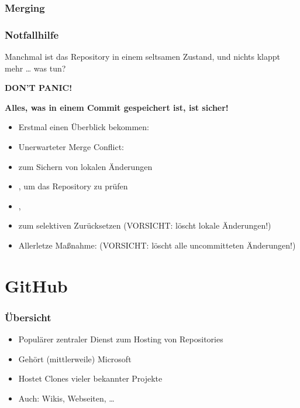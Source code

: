 \documentclass{cms-kurs}
\begin{document}
\begin{frame}
  \frametitle{Merging}

  \onslide<+->


\end{frame}

\begin{frame}
  \frametitle{Notfallhilfe}

  \onslide<+->

  Manchmal ist das Repository in einem seltsamen Zustand, und nichts klappt mehr
  … was tun?

  \onslide<+->

  \begin{center}
    \Large\textcolor{red!80!black}{\textbf{DON'T PANIC!}}
  \end{center}

  \smallskip{}

  \textbf{Alles, was in einem Commit gespeichert ist, ist sicher!}

  \medskip{}

  \begin{itemize}[<+->]
  \item Erstmal einen Überblick bekommen: 
  \item Unerwarteter Merge Conflict: 
  \item {} zum Sichern von lokalen Änderungen
  \item {}, um das Repository zu prüfen
  \item {}, 
  \item {} zum selektiven Zurücksetzen (VORSICHT:
    löscht lokale Änderungen!)
  \item Allerletze Maßnahme:  (VORSICHT: löscht
    alle uncommitteten Änderungen!)
  \end{itemize}

\end{frame}


\section{GitHub}

\begin{frame}
  \frametitle{Übersicht}

  \onslide<+->

  \begin{itemize}
  \item Populärer zentraler Dienst zum Hosting von Repositories
  \item Gehört (mittlerweile) Microsoft
  \item Hostet Clones vieler bekannter Projekte
  \item Auch: Wikis, Webseiten, …
  \end{itemize}

\end{frame}
\end{document}
